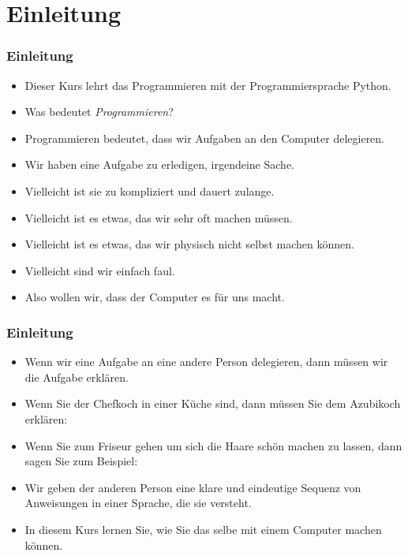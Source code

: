 \documentclass[aspectratio=169,mathserif,notheorems]{beamer}%
\subtitle{2.~Einleitung}%
\begin{document}
%
%
\startPresentation%
%
\section{Einleitung}%
%
\begin{frame}%
\frametitle{Einleitung}%
\begin{itemize}%
\item Dieser Kurs lehrt das Programmieren mit der Programmiersprache Python.%
\item<2-> Was bedeutet \emph{Programmieren}?%
\item<3-> Programmieren bedeutet, dass wir Aufgaben an den Computer delegieren.%
\item<4-> Wir haben eine Aufgabe zu erledigen, irgendeine Sache.%
\item<5-> Vielleicht ist sie zu kompliziert und dauert zulange.%
\item<6-> Vielleicht ist es etwas, das wir sehr oft machen müssen.%
\item<7-> Vielleicht ist es etwas, das wir physisch nicht selbst machen können.%
\item<8-> Vielleicht sind wir einfach faul.%
\item<9-> Also wollen wir, dass der Computer es für uns macht.%
\end{itemize}%
\end{frame}%
%
\begin{frame}%
\frametitle{Einleitung}%
\begin{itemize}%
\item Wenn wir eine Aufgabe an eine andere Person delegieren, dann müssen wir die Aufgabe erklären.%
\item<2-> Wenn Sie der Chefkoch in einer Küche sind, dann müssen Sie dem Azubikoch erklären: %
\item<3-> Wenn Sie zum Friseur gehen um sich die Haare schön machen zu lassen, dann sagen Sie zum Beispiel:
\item<4-> Wir geben der anderen Person eine klare und eindeutige Sequenz von Anweisungen in einer Sprache, die sie versteht.%
\item<5-> In diesem Kurs lernen Sie, wie Sie das selbe mit einem Computer machen können.%
\end{itemize}%
\end{frame}%
%
%
\end{document}
